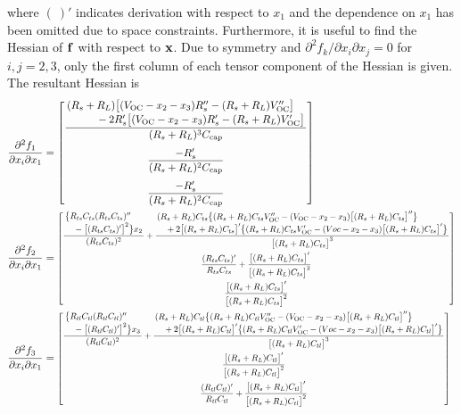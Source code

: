 \documentclass[../zhang_thesis.tex]{subfiles}
\begin{document}
where $(\ )'$ indicates derivation with respect to $x_1$ and the dependence on $x_1$ has been omitted due to space constraints. Furthermore, it is useful to find the Hessian of $\mathbf{f}$ with respect to $\mathbf{x}$. Due to symmetry and $\partial^2 f_k/\partial x_i\partial x_j = 0$ for $i,j=2,3$, only the first column of each tensor component of the Hessian is given. The resultant Hessian is
\begin{align}
    \frac{\partial^2 f_1}{\partial x_i \partial x_1} & = \begin{bmatrix}
            \dfrac{\splitfrac{(R_s+R_L)\big[(V_\text{OC}-x_2-x_3)R_s''-(R_s+R_L)V_\text{OC}''\big]}{- 2R_s' \big[(V_\text{OC}-x_2-x_3)R_s' - (R_s+R_L)V_\text{OC}'\big]}}{(R_s+R_L)^3 C_\text{cap}} \\[3ex]
            \dfrac{-R_s'}{(R_s+R_L)^2 C_\text{cap}} \\[3ex]
            \dfrac{-R_s'}{(R_s+R_L)^2 C_\text{cap}}
        \end{bmatrix} \\
    \frac{\partial^2 f_2}{\partial x_i \partial x_1} & = \scalemath{0.8}{ \begin{bmatrix}
            \dfrac{\splitfrac{\big\{R_{ts}C_{ts}(R_{ts}C_{ts})''}{- \big[(R_{ts}C_{ts})'\big]^2\big\}x_2}}{(R_{ts}C_{ts})^2} + \dfrac{\splitfrac{(R_s+R_L)C_{ts}\big\{(R_s+R_L)C_{ts}V_\text{OC}'' - (V_\text{OC}-x_2-x_3)\big[(R_s+R_L)C_{ts}\big]''\big\}}{+ 2 \big[(R_s+R_L)C_{ts}\big]' \big\{(R_s+R_L)C_{ts}V_\text{OC}' - (Voc-x_2-x_3)\big[(R_s+R_L)C_{ts}\big]'\big\}}}{\big[(R_s+R_L)C_{ts}\big]^3} \\[3ex]
            \dfrac{(R_{ts}C_{ts})'}{R_{ts}C_{ts}}+\dfrac{\big[(R_s+R_L)C_{ts}\big]'}{\big[(R_s+R_L)C_{ts}\big]^2} \\[3ex]
            \dfrac{\big[(R_s+R_L)C_{ts}\big]'}{\big[(R_s+R_L)C_{ts}\big]^2}
        \end{bmatrix} } \\
    \frac{\partial^2 f_3}{\partial x_i \partial x_1} & = \scalemath{0.8}{ \begin{bmatrix}
            \dfrac{\splitfrac{\big\{R_{tl}C_{tl}(R_{tl}C_{tl})''}{- \big[(R_{tl}C_{tl})'\big]^2\big\}x_3}}{(R_{tl}C_{tl})^2} + \dfrac{\splitfrac{(R_s+R_L)C_{tl}\big\{(R_s+R_L)C_{tl}V_\text{OC}'' - (V_\text{OC}-x_2-x_3)\big[(R_s+R_L)C_{tl}\big]''\big\}}{+ 2 \big[(R_s+R_L)C_{tl}\big]' \big\{(R_s+R_L)C_{tl}V_\text{OC}' - (Voc-x_2-x_3)\big[(R_s+R_L)C_{tl}\big]'\big\}}}{\big[(R_s+R_L)C_{tl}\big]^3} \\[3ex]
            \dfrac{\big[(R_s+R_L)C_{tl}\big]'}{\big[(R_s+R_L)C_{tl}\big]^2} \\[3ex]
            \dfrac{(R_{tl}C_{tl})'}{R_{tl}C_{tl}}+\dfrac{\big[(R_s+R_L)C_{tl}\big]'}{\big[(R_s+R_L)C_{tl}\big]^2}
        \end{bmatrix} }
\end{align}
\end{document}
